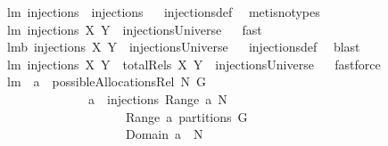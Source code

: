 \begin{isabellebody}
\isamarkupfalse%
\ lm{}{}{\isacharcolon}\ {\isachardoublequoteopen}injections\ {\isacharequal}\ injections{\isacharprime}{\isachardoublequoteclose}%
\isadelimproof
\ %
\endisadelimproof
%
\isatagproof
{}\isamarkupfalse%
\ injections{\isacharunderscore}def\ \isamarkupfalse%
\ {\isacharparenleft}metis{\isacharparenleft}no{\isacharunderscore}types{\isacharparenright}{\isacharparenright}%
\endisatagproof
{\isafoldproof}%
%
\isadelimproof
%
\endisadelimproof
\isanewline
{}\isamarkupfalse%
\ lm{}{}{\isacharcolon}\ {\isachardoublequoteopen}injections{\isacharprime}\ X\ Y\ {\isasymsubseteq}\ injectionsUniverse{\isachardoublequoteclose}%
\isadelimproof
\ %
\endisadelimproof
%
\isatagproof
{}\isamarkupfalse%
\ fast%
\endisatagproof
{\isafoldproof}%
%
\isadelimproof
%
\endisadelimproof
\isanewline
{}\isamarkupfalse%
\ lm{}{}b{\isacharcolon}\ {\isachardoublequoteopen}injections\ X\ Y\ {\isasymsubseteq}\ injectionsUniverse{\isachardoublequoteclose}%
\isadelimproof
\ %
\endisadelimproof
%
\isatagproof
{}\isamarkupfalse%
\ injections{\isacharunderscore}def\ \isamarkupfalse%
\ blast%
\endisatagproof
{\isafoldproof}%
%
\isadelimproof
%
\endisadelimproof
\isanewline
{}\isamarkupfalse%
\ lm{}{}{\isacharcolon}\ {\isachardoublequoteopen}injections{\isacharprime}\ X\ Y\ {\isacharequal}\ totalRels\ X\ Y\ {\isasyminter}\ injectionsUniverse{\isachardoublequoteclose}%
\isadelimproof
\ %
\endisadelimproof
%
\isatagproof
{}\isamarkupfalse%
\ fastforce%
\endisatagproof
{\isafoldproof}%
%
\isadelimproof
%
\endisadelimproof
\isanewline
\isanewline
{}\isamarkupfalse%
\ lm{}{}{\isacharcolon}\ \ {\isachardoublequoteopen}a\ {\isasymin}\ possibleAllocationsRel\ N\ G{\isachardoublequoteclose}\ \isanewline
\ \ \ \ \ \ \ \ \ \ \ \ \ \ {\isachardoublequoteopen}a{\isacharcircum}{\isacharminus}{}\ {\isasymin}\ injections\ {\isacharparenleft}Range\ a{\isacharparenright}\ N\ {\isacharampersand}\ \isanewline
\ \ \ \ \ \ \ \ \ \ \ \ \ \ \ \ \ \ \ \ {\isacharparenleft}Range\ a{\isacharparenright}\ partitions\ G\ {\isacharampersand}\ \isanewline
\ \ \ \ \ \ \ \ \ \ \ \ \ \ \ \ \ \ \ \ Domain\ a\ {\isasymsubseteq}\ N{\isachardoublequoteclose}\ \isanewline
%
\isadelimproof
\ \ \ \ \ \ \ \ \ \ \ \ %
\endisadelimproof
%
\isatagproof
{}\isamarkupfalse%

\end{isabellebody}
